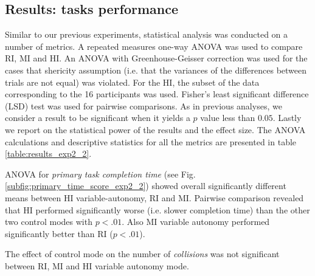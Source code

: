 \documentclass[a4paper,12pt,oneside,openright]{bhamthesis}
\begin{document}
 
\subsection{Results: tasks performance}
\label{chapter5:sim_results_system}
Similar to our previous experiments, statistical analysis was conducted on a number of metrics. A repeated measures one-way ANOVA was used to compare RI, MI and HI. An ANOVA with Greenhouse-Geisser correction was used for the cases that shericity assumption (i.e. that the variances of the differences between trials are not equal) was violated. For the HI, the subset of the data corresponding to the 16 participants was used. Fisher's least significant difference (LSD) test was used for pairwise comparisons. As in previous analyses, we consider a result to be significant when it yields a $p$ value less than $0.05$. Lastly we report on the statistical power of the results and the effect size. The ANOVA calculations and descriptive statistics for all the metrics are presented in table \ref{table:results_exp2_2}. 

ANOVA for \textit{primary task completion time} (see Fig. \ref{subfig:primary_time_score_exp2_2}) showed overall significantly different means between HI variable-autonomy, RI and MI. Pairwise comparison revealed that HI performed significantly worse (i.e. slower completion time) than the other two control modes with \textit{$p <.01$}. Also MI variable autonomy performed significantly better than RI (\textit{$p <.01$}). 

The effect of control mode on the number of \textit{collisions} was not significant between RI, MI and HI variable autonomy mode.
\end{document}
